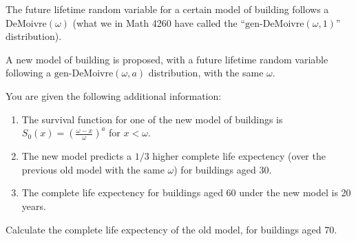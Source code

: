 The future lifetime random variable for a certain model of building follows a DeMoivre$(\omega)$ (what we in Math 4260 have called the ``$\mbox{gen-DeMoivre}(\omega, 1)$'' distribution).

\bigskip
A new model of building is proposed, with a future lifetime random variable following a $\mbox{gen-DeMoivre}(\omega,a)$ distribution, with the same $\omega.$

\bigskip

You are given the following additional information:
\begin{enumerate}
\item The survival function for one of the new model of buildings is  ${\displaystyle S_0(x)=\left(\frac{\omega-x}{\omega}\right)^a}$ for $x<\omega$. 
\item The new model predicts a $1/3$ higher complete life expectency (over the previous old model with the same $\omega$) for buildings aged 30.
\item The complete life expectency for buildings aged 60 under the new model is 20 years. 
\end{enumerate}
Calculate the complete life expectency of the old model, for buildings aged 70. 

